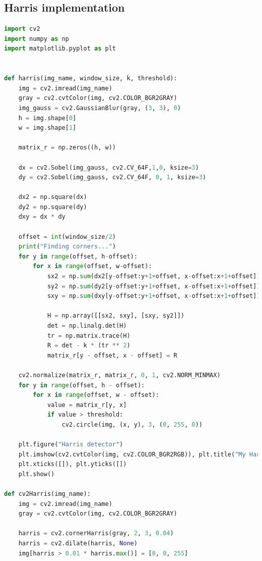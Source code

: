 \documentclass{article}
\begin{document}
    \newpage
    \begin{appendices}

        \section{Harris implementation}
        \label{appendix:code}
        \begin{lstlisting}[language=Python]
import cv2
import numpy as np
import matplotlib.pyplot as plt


def harris(img_name, window_size, k, threshold):
    img = cv2.imread(img_name)
    gray = cv2.cvtColor(img, cv2.COLOR_BGR2GRAY)
    img_gauss = cv2.GaussianBlur(gray, (3, 3), 0)
    h = img.shape[0]
    w = img.shape[1]

    matrix_r = np.zeros((h, w))

    dx = cv2.Sobel(img_gauss, cv2.CV_64F,1,0, ksize=3)
    dy = cv2.Sobel(img_gauss, cv2.CV_64F, 0, 1, ksize=3)

    dx2 = np.square(dx)
    dy2 = np.square(dy)
    dxy = dx * dy

    offset = int(window_size/2)
    print("Finding corners...")
    for y in range(offset, h-offset):
        for x in range(offset, w-offset):
            sx2 = np.sum(dx2[y-offset:y+1+offset, x-offset:x+1+offset])
            sy2 = np.sum(dy2[y-offset:y+1+offset, x-offset:x+1+offset])
            sxy = np.sum(dxy[y-offset:y+1+offset, x-offset:x+1+offset])

            H = np.array([[sx2, sxy], [sxy, sy2]])
            det = np.linalg.det(H)
            tr = np.matrix.trace(H)
            R = det - k * (tr ** 2)
            matrix_r[y - offset, x - offset] = R

    cv2.normalize(matrix_r, matrix_r, 0, 1, cv2.NORM_MINMAX)
    for y in range(offset, h - offset):
        for x in range(offset, w - offset):
            value = matrix_r[y, x]
            if value > threshold:
                cv2.circle(img, (x, y), 3, (0, 255, 0))

    plt.figure("Harris detector")
    plt.imshow(cv2.cvtColor(img, cv2.COLOR_BGR2RGB)), plt.title("My Harris")
    plt.xticks([]), plt.yticks([])
    plt.show()

def cv2Harris(img_name):
    img = cv2.imread(img_name)
    gray = cv2.cvtColor(img, cv2.COLOR_BGR2GRAY)

    harris = cv2.cornerHarris(gray, 2, 3, 0.04)
    harris = cv2.dilate(harris, None)
    img[harris > 0.01 * harris.max()] = [0, 0, 255]


\end{lstlisting}
\end{appendices}
\end{document}
